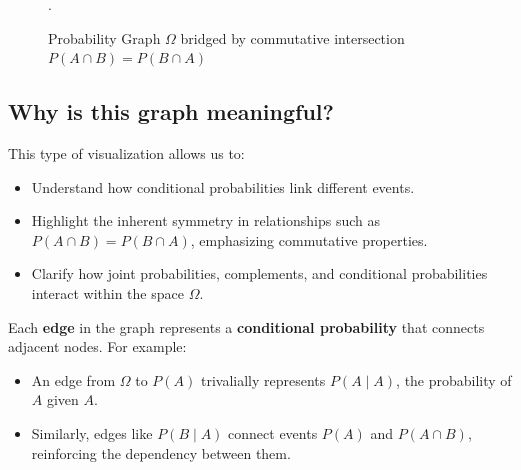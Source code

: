 \documentclass[
  12 pt,
  a4paper,
]{book}
\providecommand{\tightlist}{%
  \setlength{\itemsep}{0pt}\setlength{\parskip}{0pt}}
\numberwithin{equation}{section}
\theoremstyle{plain}      %
\theoremstyle{definition} %
\theoremstyle{remark}     %
\theoremstyle{note}         %
\begin{document}
\begin{figure}[htbp]
\caption{Probability Graph $\Omega$ bridged by commutative intersection $P(A \cap B) = P(B \cap A)$}.
\label{fig:ProbGraph1-diagram}
\end{figure}

\hypertarget{why-is-this-graph-meaningful}{%
\subsection{Why is this graph
meaningful?}\label{why-is-this-graph-meaningful}}

This type of visualization allows us to:

\begin{itemize}
\tightlist
\item
  Understand how conditional probabilities link different events.
\item
  Highlight the inherent symmetry in relationships such as
  \(P(A \cap B) = P(B \cap A)\), emphasizing commutative properties.
\item
  Clarify how joint probabilities, complements, and conditional
  probabilities interact within the space \(\Omega\).
\end{itemize}

Each \textbf{edge} in the graph represents a \textbf{conditional
probability} that connects adjacent nodes. For example:

\begin{itemize}
\tightlist
\item
  An edge from \(\Omega\) to \(P(A)\) trivalially represents
  \(P(A \mid A)\), the probability of \(A\) given \(A\).
\item
  Similarly, edges like \(P(B \mid A)\) connect events \(P(A)\) and
  \(P(A \cap B)\), reinforcing the dependency between them.
\end{itemize}
\end{document}
